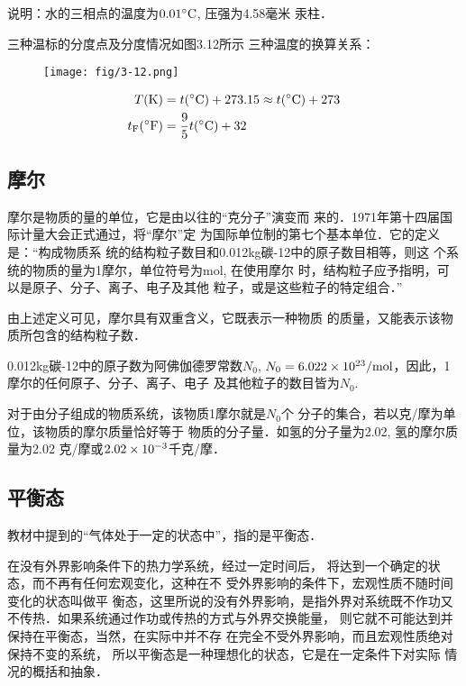 说明：水的三相点的温度为$0.01^{\circ}{\rm C}$, 压强为4.58毫米
汞柱．

三种温标的分度点及分度情况如图3.12所示
三种温度的换算关系：
\begin{figure}[htp]
    \centering
    \texttt{[image: fig/3-12.png]}
    \caption{}
\end{figure}

\[\begin{split}
   T({\rm K}) &= t({\rm ^{\circ}C})+273.15\approx t({\rm ^{\circ}C})+273\\
   t_{\rm F}({\rm ^{\circ}F})&=\frac{9}{5}t({\rm ^{\circ}C})+32 
\end{split}\]

\subsection{摩尔}
摩尔是物质的量的单位，它是由以往的“克分子”演变而
来的．1971年第十四届国际计量大会正式通过，将“摩尔”定
为国际单位制的第七个基本单位．它的定义是：“构成物质系
统的结构粒子数目和0.012kg碳-12中的原子数目相等，则这
个系统的物质的量为1摩尔，单位符号为mol, 在使用摩尔
时，结构粒子应予指明，可以是原子、分子、离子、电子及其他
粒子，或是这些粒子的特定组合．”

由上述定义可见，摩尔具有双重含义，它既表示一种物质
的质量，又能表示该物质所包含的结构粒子数．

0.012kg碳-12中的原子数为阿佛伽德罗常数$N_0$, $N_0=6.022\times10^{23}/{\rm mol}$，因此，1摩尔的任何原子、分子、离子、电子
及其他粒子的数目皆为$N_0$.

对于由分子组成的物质系统，该物质1摩尔就是$N_0$个
分子的集合，若以克/摩为单位，该物质的摩尔质量恰好等于
物质的分子量．如氢的分子量为2.02, 氢的摩尔质量为2.02
克/摩或$2.02\times10^{-3}$千克/摩．

\subsection{平衡态}
教材中提到的“气体处于一定的状态中”，指的是平衡态．

在没有外界影响条件下的热力学系统，经过一定时间后，
将达到一个确定的状态，而不再有任何宏观变化，这种在不
受外界影响的条件下，宏观性质不随时间变化的状态叫做平
衡态，这里所说的没有外界影响，是指外界对系统既不作功又
不传热．如果系统通过作功或传热的方式与外界交换能量，
则它就不可能达到并保持在平衡态，当然，在实际中并不存
在完全不受外界影响，而且宏观性质绝对保持不变的系统，
所以平衡态是一种理想化的状态，它是在一定条件下对实际
情况的概括和抽象．

